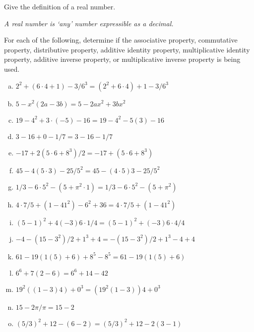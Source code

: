 \documentclass[11pt,letterpaper]{article}
\begin{document}

 Give the definition of a real number. \pvspace{1cm}

{\itshape A real number is `any' number expressible as a decimal.}





\vfill





 For each of the following, determine if the associative property, commutative property, distributive property, additive identity property, multiplicative identity property, additive inverse property, or multiplicative inverse property is being used. \pvspace{0.2cm}

\begin{enumerate}[(a)] \itemsep=2ex
        \item {} \qquad $2^2 + (6 \cdot 4 + 1) - 3/6^3 = (2^2 + 6 \cdot 4) + 1 - 3/6^3$
        \item {} \qquad $5 - x^2 (2a - 3b) = 5- 2ax^2 + 3bx^2$
        \item {} \qquad $19 - 4^2 + 3 \cdot (-5) - 16 = 19 - 4^2 - 5 (3) - 16$
        \item {} \qquad $3 - 16 + 0 -1/7 = 3 - 16 - 1/7$
        \item {} \qquad $-17 + 2(5 \cdot 6 + 8^3)/2 = -17 + (5 \cdot 6 + 8^3)$
        \item {} \qquad $45 - 4(5 \cdot 3) - 25/5^2 = 45 - (4 \cdot 5)3 - 25/5^2$
        \item {} \qquad $1/3 - 6 \cdot 5^2 - (5 + \pi^2 \cdot 1) = 1/3 - 6 \cdot 5^2 - (5 + \pi^2)$
        \item {} \qquad $4 \cdot 7/5 + (1 - 41^2) - 6^2 + 36 = 4 \cdot 7/5 + (1 - 41^2)$
        \item {} \qquad $(5 - 1)^2 + 4(-3)6 \cdot 1/4 = (5 - 1)^2 + (-3)6 \cdot 4/4$
        \item {} \qquad $-4 - (15 - 3^2)/2 + 1^3 + 4 = - (15 - 3^2)/2 + 1^3 - 4 + 4$
        \item {} \qquad $61 - 19( 1(5) + 6) + 8^5 - 8^5 = 61 - 19( 1(5) + 6)$
        \item {} \qquad $6^6 + 7(2 - 6) = 6^6 + 14 - 42$
        \item {} \qquad $19^2 ((1 - 3)4) + 0^3 = (19^2 (1 - 3))4 + 0^3$
        \item {} \qquad $15 - 2\pi/\pi = 15 - 2$
        \item {} \qquad $(5/3)^2 + 12 - (6 - 2) = (5/3)^2 + 12 - 2(3 - 1)$
        \end{enumerate}
\end{document}
